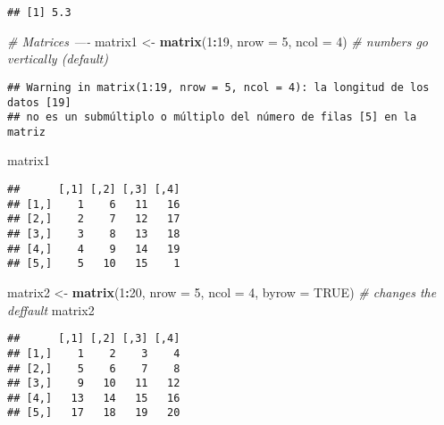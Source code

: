 \documentclass[]{article}
\newenvironment{Shaded}{\begin{snugshade}}{\end{snugshade}}
\newcommand{\KeywordTok}[1]{\textcolor[rgb]{0.13,0.29,0.53}{\textbf{#1}}}
\newcommand{\DataTypeTok}[1]{\textcolor[rgb]{0.13,0.29,0.53}{#1}}
\newcommand{\DecValTok}[1]{\textcolor[rgb]{0.00,0.00,0.81}{#1}}
\newcommand{\StringTok}[1]{\textcolor[rgb]{0.31,0.60,0.02}{#1}}
\newcommand{\CommentTok}[1]{\textcolor[rgb]{0.56,0.35,0.01}{\textit{#1}}}
\newcommand{\OtherTok}[1]{\textcolor[rgb]{0.56,0.35,0.01}{#1}}
\newcommand{\OperatorTok}[1]{\textcolor[rgb]{0.81,0.36,0.00}{\textbf{#1}}}
\newcommand{\NormalTok}[1]{#1}
\begin{document}
\begin{verbatim}
## [1] 5.3
\end{verbatim}

\begin{Shaded}
\begin{Highlighting}[]
\CommentTok{# Matrices ----}
\NormalTok{matrix1 <-}\StringTok{ }\KeywordTok{matrix}\NormalTok{(}\DecValTok{1}\OperatorTok{:}\DecValTok{19}\NormalTok{, }\DataTypeTok{nrow =} \DecValTok{5}\NormalTok{, }\DataTypeTok{ncol =} \DecValTok{4}\NormalTok{) }\CommentTok{# numbers go vertically (default)}
\end{Highlighting}
\end{Shaded}

\begin{verbatim}
## Warning in matrix(1:19, nrow = 5, ncol = 4): la longitud de los datos [19]
## no es un submúltiplo o múltiplo del número de filas [5] en la matriz
\end{verbatim}

\begin{Shaded}
\begin{Highlighting}[]
\NormalTok{matrix1}
\end{Highlighting}
\end{Shaded}

\begin{verbatim}
##      [,1] [,2] [,3] [,4]
## [1,]    1    6   11   16
## [2,]    2    7   12   17
## [3,]    3    8   13   18
## [4,]    4    9   14   19
## [5,]    5   10   15    1
\end{verbatim}

\begin{Shaded}
\begin{Highlighting}[]
\NormalTok{matrix2 <-}\StringTok{ }\KeywordTok{matrix}\NormalTok{(}\DecValTok{1}\OperatorTok{:}\DecValTok{20}\NormalTok{, }\DataTypeTok{nrow =} \DecValTok{5}\NormalTok{, }\DataTypeTok{ncol =} \DecValTok{4}\NormalTok{, }\DataTypeTok{byrow =} \OtherTok{TRUE}\NormalTok{) }\CommentTok{# changes the deffault}
\NormalTok{matrix2}
\end{Highlighting}
\end{Shaded}

\begin{verbatim}
##      [,1] [,2] [,3] [,4]
## [1,]    1    2    3    4
## [2,]    5    6    7    8
## [3,]    9   10   11   12
## [4,]   13   14   15   16
## [5,]   17   18   19   20
\end{verbatim}
\end{document}
